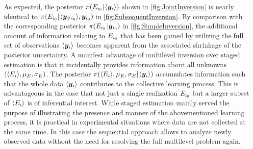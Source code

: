 \par %
As expected, the posterior \(\pi(E_{i_0} {\:\!}|{\:\!} \langle{\bm{y}_i}\rangle)\) shown in \cref{fig:JointInversion} is nearly identical to
\(\pi(E_{i_0} {\:\!}|{\:\!} \langle{\bm{y}_{\neq i_0}}\rangle,\bm{y}_{i_0})\) in \cref{fig:SubsequentInversion}.
By comparison with the corresponding posterior \(\pi(E_{i_0} {\:\!}|{\:\!} \bm{y}_{i_0})\) in \cref{fig:SimpleInversion},
the additional amount of information relating to \(E_{i_0}\) that has been gained by utilizing the full set of observations \(\langle{\bm{y}_i}\rangle\) becomes apparent from the associated shrinkage of the posterior uncertainty.
A manifest advantage of multilevel inversion over staged estimation is that it incidentally provides information about all unknowns \((\langle{E_i}\rangle,\mu_E,\sigma_E)\).
The posterior \(\pi(\langle{E_i}\rangle,\mu_E,\sigma_E {\:\!}|{\:\!} \langle{\bm{y}_i}\rangle)\) accumulates information such that the whole data \(\langle{\bm{y}_i}\rangle\) contributes to the collective learning process.
This is advantageous in the case that not just a single realization \(E_{i_0}\) but a larger subset of \(\langle{E_i}\rangle\) is of inferential interest.
While staged estimation mainly served the purpose of illustrating the presence and manner of the abovementioned learning process,
it is practical in experimental situations where data are not collected at the same time.
In this case the sequential approach allows to analyze newly observed data without the need for resolving the full multilevel problem again.

